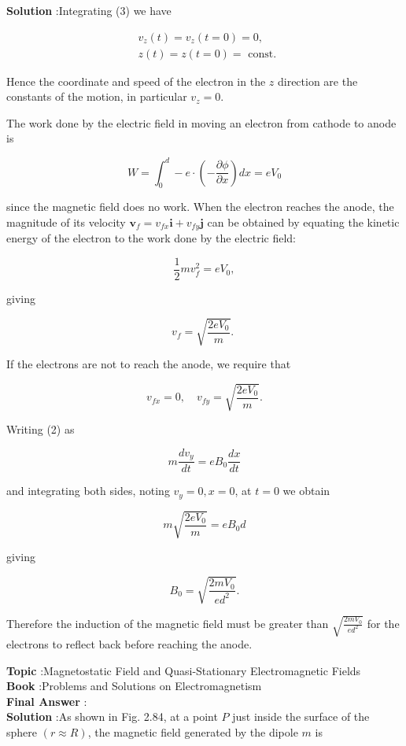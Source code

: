 \documentclass[10pt]{article}
\begin{document}
\textbf{Solution} :Integrating (3) we have

$$
\begin{aligned}
&v_{z}(t)=v_{z}(t=0)=0, \\
&z(t)=z(t=0)=\text { const. }
\end{aligned}
$$

Hence the coordinate and speed of the electron in the $z$ direction are the constants of the motion, in particular $v_{z}=0$.

 The work done by the electric field in moving an electron from cathode to anode is

$$
W=\int_{0}^{d}-e \cdot\left(-\frac{\partial \phi}{\partial x}\right) d x=e V_{0}
$$

since the magnetic field does no work. When the electron reaches the anode, the magnitude of its velocity $\mathbf{v}_{f}=v_{f x} \mathbf{i}+v_{f y} \mathbf{j}$ can be obtained by equating the kinetic energy of the electron to the work done by the electric field:

$$
\frac{1}{2} m v_{f}^{2}=e V_{0},
$$

giving

$$
v_{f}=\sqrt{\frac{2 e V_{0}}{m}} \text {. }
$$

If the electrons are not to reach the anode, we require that

$$
v_{f x}=0, \quad v_{f y}=\sqrt{\frac{2 e V_{0}}{m}} .
$$

Writing (2) as

$$
m \frac{d v_{y}}{d t}=e B_{0} \frac{d x}{d t}
$$

and integrating both sides, noting $v_{y}=0, x=0$, at $t=0$ we obtain

$$
m \sqrt{\frac{2 e V_{0}}{m}}=e B_{0} d
$$

giving

$$
B_{0}=\sqrt{\frac{2 m V_{0}}{e d^{2}}} .
$$

Therefore the induction of the magnetic field must be greater than $\sqrt{\frac{2 m V_{0}}{e d^{2}}}$ for the electrons to reflect back before reaching the anode. 

\textbf{Topic} :Magnetostatic Field and Quasi-Stationary Electromagnetic Fields\\
\textbf{Book} :Problems and Solutions on Electromagnetism\\
\textbf{Final Answer} :\\


\textbf{Solution} :As shown in Fig. 2.84, at a point $P$ just inside the surface of the sphere $(r \approx R)$, the magnetic field generated by the dipole $m$ is
\end{document}
